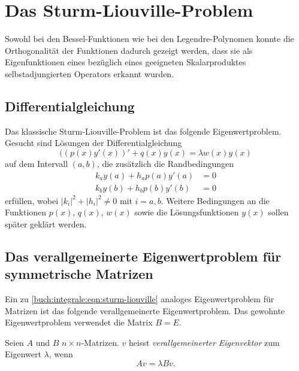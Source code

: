 %
%
%
\section{Das Sturm-Liouville-Problem
\label{buch:integrale:subsection:sturm-liouville-problem}}
Sowohl bei den Bessel-Funktionen wie bei den Legendre-Polynomen
konnte die Orthogonalität der Funktionen dadurch gezeigt werden,
dass sie als Eigenfunktionen eines bezüglich eines geeigneten
Skalarproduktes selbstadjungierten Operators erkannt wurden.

\subsection{Differentialgleichung}
Das klassische Sturm-Liouville-Problem ist das folgende Eigenwertproblem.
Gesucht sind Lösungen der Differentialgleichung
\begin{equation}
((p(x)y'(x))' + q(x)y(x) = \lambda w(x) y(x)
\label{buch:integrale:eqn:sturm-liouville}
\end{equation}
auf dem Intervall $(a,b)$, die zusätzlich die Randbedingungen
\begin{equation}
\begin{aligned}
k_a y(a) + h_a p(a) y'(a) &= 0 \\
k_b y(b) + h_b p(b) y'(b) &= 0
\end{aligned}
\label{buch:integrale:sturm:randbedingung}
\end{equation}
erfüllen, wobei $|k_i|^2 + |h_i|^2\ne 0$ mit $i=a,b$.
Weitere Bedingungen an die Funktionen $p(x)$, $q(x)$, $w(x)$  sowie die
Lösungsfunktionen $y(x)$ sollen später geklärt werden.

\subsection{Das verallgemeinerte Eigenwertproblem für symmetrische Matrizen}
Ein zu \eqref{buch:integrale:eqn:sturm-liouville} analoges Eigenwertproblem
für Matrizen ist das folgende verallgemeinerte Eigenwertproblem.
Das gewohnte Eigenwertproblem verwendet die Matrix $B=E$.

\begin{definition}
%
%
\label{buch:orthogonal:sturm:verallgemeinerter-eigenvektor}
Seien $A$ und $B$ $n\times n$-Matrizen.
$v$ heisst {\em verallgemeinerter Eigenvektor} zum Eigenwert $\lambda$,
wenn
\[
Av = \lambda Bv.
\]
\end{definition}

